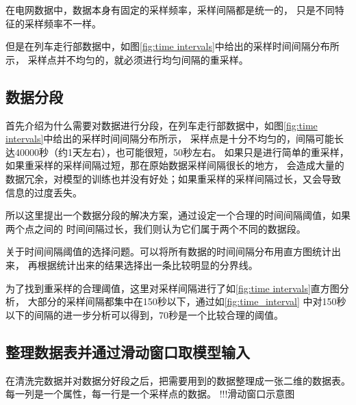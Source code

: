   在电网数据中，数据本身有固定的采样频率，采样间隔都是统一的，
  只是不同特征的采样频率不一样。

  但是在列车走行部数据中，如图\ref{fig:time intervals}中给出的采样时间间隔分布所示，
  采样点并不均匀的，就必须进行均匀间隔的重采样。

  \subsection{数据分段}
  首先介绍为什么需要对数据进行分段，在列车走行部数据中，如图\ref{fig:time intervals}中给出的采样时间间隔分布所示，
  采样点是十分不均匀的，间隔可能长达40000秒（约1天左右），也可能很短，50秒左右。
  如果只是进行简单的重采样，如果重采样的采样间隔过短，那在原始数据采样间隔很长的地方，
  会造成大量的数据冗余，对模型的训练也并没有好处；如果重采样的采样间隔过长，又会导致
  信息的过度丢失。

  所以这里提出一个数据分段的解决方案，通过设定一个合理的时间间隔阈值，如果两个点之间的
  时间间隔过长，我们则认为它们属于两个不同的数据段。

  关于时间间隔阈值的选择问题。可以将所有数据的时间间隔分布用直方图统计出来，
  再根据统计出来的结果选择出一条比较明显的分界线。

  为了找到重采样的合理阈值，这里对采样间隔进行了如\ref{fig:time intervals}直方图分析，
  大部分的采样间隔都集中在150秒以下，通过如\ref{fig:time_interval}
  中对150秒以下的间隔的进一步分析可以得到，70秒是一个比较合理的阈值。

  \subsection{整理数据表并通过滑动窗口取模型输入}
  在清洗完数据并对数据分好段之后，把需要用到的数据整理成一张二维的数据表。
  每一列是一个属性，每一行是一个采样点的数据。
  !!!滑动窗口示意图




